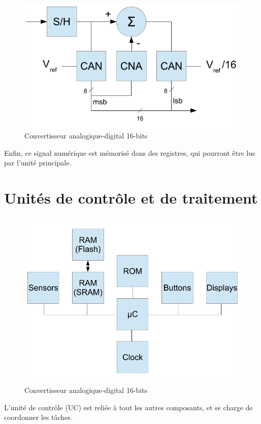 \documentclass[a4paper]{article} %
\begin{document}
\begin{figure}[h!]
	\centering
	\includegraphics[scale=0.8]{can.pdf}
	\caption{Convertisseur analogique-digital 16-bits}
\end{figure}

Enfin, ce signal numérique est mémorisé dans des registres, qui pourront être lus par l'unité principale.


\section{Unités de contrôle et de traitement}

\begin{figure}[h!]
	\centering
	\includegraphics[scale=0.8]{uc.pdf}
	\caption{Convertisseur analogique-digital 16-bits}
\end{figure}

L'unité de contrôle (UC) est reliée à tout les autres composants, et se charge de coordonner les tâches.
\end{document}
